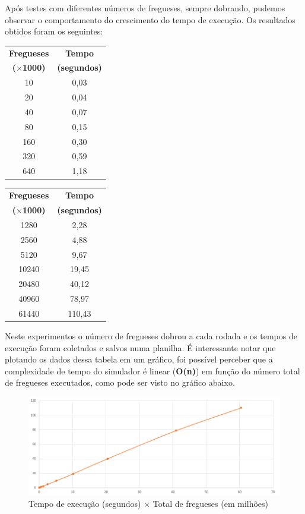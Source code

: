 \documentclass[a4paper,12pt]{report}
\begin{document}
Após testes com diferentes números de fregueses, sempre dobrando, pudemos observar o comportamento do crescimento do tempo de execução. Os resultados obtidos foram os seguintes:

\begin{center}
\begin{tabular}{c c}
\hline
\textbf{Fregueses} & \textbf{Tempo} \\[-4pt]
\textbf{($\times$1000)} & \textbf{(segundos)}\\[3pt]
\hline
10 & 0,03\\
20 & 0,04\\
40 & 0,07\\
80 & 0,15\\
160 & 0,30\\
320 & 0,59\\
640 & 1,18\\
\hline
\end{tabular} \qquad \qquad
\begin{tabular}{c c}
\hline
\textbf{Fregueses} & \textbf{Tempo} \\[-4pt]
\textbf{($\times$1000)} & \textbf{(segundos)}\\[3pt]
\hline
1280 & 2,28\\
2560 & 4,88\\
5120 & 9,67\\
10240 & 19,45\\
20480 & 40,12\\
40960 & 78,97\\
61440 & 110,43\\
\hline
\end{tabular}
\end{center}


Neste experimentos o número de fregueses dobrou a cada rodada e os tempos de execução foram coletados e salvos numa planilha. É interessante notar que plotando os dados dessa tabela em um gráfico, foi possível perceber que a complexidade de tempo do simulador é linear (\textbf{O(n)}) em função do número total de fregueses executados, como pode ser visto no gráfico abaixo.


\begin{figure}[H]
\centering
\includegraphics[width=1\textwidth]{./graficos/tempoexecucao2.png}
\vspace{-10mm}
\caption{Tempo de execução (segundos) $\times$ Total de fregueses (em milhões)}
\label{fig:tempo_execucao}
\end{figure}
\end{document}
